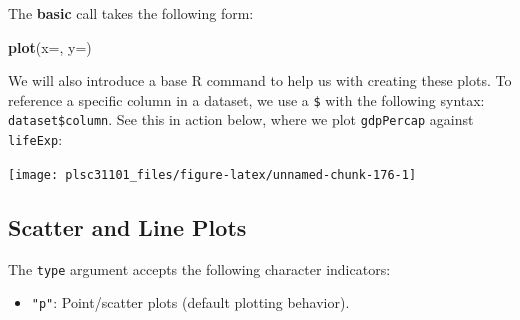 \documentclass[
]{book}
\newenvironment{Shaded}{\begin{snugshade}}{\end{snugshade}}
\newcommand{\DataTypeTok}[1]{\textcolor[rgb]{0.13,0.29,0.53}{#1}}
\newcommand{\KeywordTok}[1]{\textcolor[rgb]{0.13,0.29,0.53}{\textbf{#1}}}
\newcommand{\NormalTok}[1]{#1}
\newcommand{\OperatorTok}[1]{\textcolor[rgb]{0.81,0.36,0.00}{\textbf{#1}}}
\newcommand{\StringTok}[1]{\textcolor[rgb]{0.31,0.60,0.02}{#1}}
\providecommand{\tightlist}{%
  \setlength{\itemsep}{0pt}\setlength{\parskip}{0pt}}
\begin{document}
The \textbf{basic} call takes the following form:

\begin{Shaded}
\begin{Highlighting}[]
\KeywordTok{plot}\NormalTok{(}\DataTypeTok{x=}\NormalTok{, }\DataTypeTok{y=}\NormalTok{)}
\end{Highlighting}
\end{Shaded}

We will also introduce a base R command to help us with creating these plots. To reference a specific column in a dataset, we use a \texttt{\$} with the following syntax: \texttt{dataset\$column}. See this in action below, where we plot \texttt{gdpPercap} against \texttt{lifeExp}:

\begin{Shaded}
\end{Shaded}

\begin{center}\texttt{[image: plsc31101\_files/figure-latex/unnamed-chunk-176-1]} \end{center}

\hypertarget{scatter-and-line-plots}{%
\subsection{Scatter and Line Plots}\label{scatter-and-line-plots}}

The \texttt{type} argument accepts the following character indicators:

\begin{itemize}
\tightlist
\item
  \texttt{"p"}: Point/scatter plots (default plotting behavior).
\end{itemize}

\begin{Shaded}
\end{Shaded}
\end{document}
